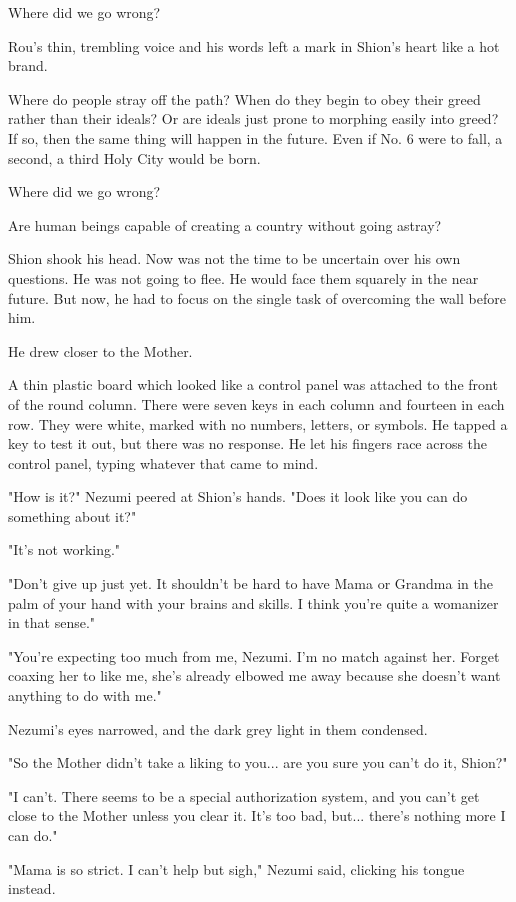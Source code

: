 Where did we go wrong?

Rou's thin, trembling voice and his words left a mark in Shion's heart
like a hot brand.

Where do people stray off the path? When do they begin to obey their
greed rather than their ideals? Or are ideals just prone to morphing
easily into greed? If so, then the same thing will happen in the future.
Even if No. 6 were to fall, a second, a third Holy City would be born.

Where did we go wrong?

Are human beings capable of creating a country without going astray?

Shion shook his head. Now was not the time to be uncertain over his own
questions. He was not going to flee. He would face them squarely in the
near future. But now, he had to focus on the single task of overcoming
the wall before him.

He drew closer to the Mother.

A thin plastic board which looked like a control panel was attached to
the front of the round column. There were seven keys in each column and
fourteen in each row. They were white, marked with no numbers, letters,
or symbols. He tapped a key to test it out, but there was no response.
He let his fingers race across the control panel, typing whatever that
came to mind.

"How is it?" Nezumi peered at Shion's hands. "Does it look like you can
do something about it?"

"It's not working."

"Don't give up just yet. It shouldn't be hard to have Mama or Grandma in
the palm of your hand with your brains and skills. I think you're quite
a womanizer in that sense."

"You're expecting too much from me, Nezumi. I'm no match against her.
Forget coaxing her to like me, she's already elbowed me away because she
doesn't want anything to do with me."

Nezumi's eyes narrowed, and the dark grey light in them condensed.

"So the Mother didn't take a liking to you... are you sure you can't do
it, Shion?"

"I can't. There seems to be a special authorization system, and you
can't get close to the Mother unless you clear it. It's too bad, but...
there's nothing more I can do."

"Mama is so strict. I can't help but sigh," Nezumi said, clicking his
tongue instead.

